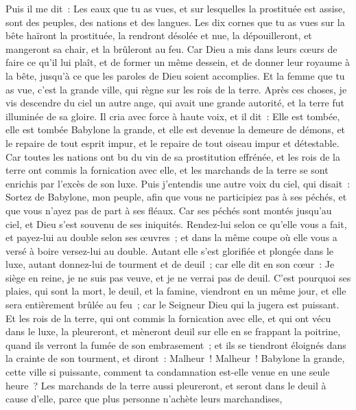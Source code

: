 \begin{multicols}{2}
Puis il me dit~: Les eaux que tu as vues, et sur lesquelles la prostituée est assise, sont des peuples, des nations et des langues.
Les dix cornes que tu as vues sur la bête haïront la prostituée, la rendront désolée et nue, la dépouilleront, et mangeront sa chair, et la brûleront au feu.
Car Dieu a mis dans leurs cœurs de faire ce qu'il lui plaît, et de former un même dessein, et de donner leur royaume à la bête, jusqu'à ce que les paroles de Dieu soient accomplies.
Et la femme que tu as vue, c'est la grande ville, qui règne sur les rois de la terre.
\VerseOne{}Après ces choses, je vis descendre du ciel un autre ange, qui avait une grande autorité, et la terre fut illuminée de sa gloire.
Il cria avec force à haute voix, et il dit~: Elle est tombée, elle est tombée Babylone la grande, et elle est devenue la demeure de démons, et le repaire de tout esprit impur, et le repaire de tout oiseau impur et détestable.
Car toutes les nations ont bu du vin de sa prostitution effrénée, et les rois de la terre ont commis la fornication avec elle, et les marchands de la terre se sont enrichis par l'excès de son luxe.
Puis j'entendis une autre voix du ciel, qui disait~: Sortez de Babylone, mon peuple, afin que vous ne participiez pas à ses péchés, et que vous n'ayez pas de part à ses fléaux.
Car ses péchés sont montés jusqu'au ciel, et Dieu s'est souvenu de ses iniquités.
Rendez-lui selon ce qu'elle vous a fait, et payez-lui au double selon ses œuvres~; et dans la même coupe où elle vous a versé à boire versez-lui au double.
Autant elle s'est glorifiée et plongée dans le luxe, autant donnez-lui de tourment et de deuil~; car elle dit en son cœur~: Je siège en reine, je ne suis pas veuve, et je ne verrai pas de deuil.
C'est pourquoi ses plaies, qui sont la mort, le deuil, et la famine, viendront en un même jour, et elle sera entièrement brûlée au feu~; car le Seigneur Dieu qui la jugera est puissant.
Et les rois de la terre, qui ont commis la fornication avec elle, et qui ont vécu dans le luxe, la pleureront, et mèneront deuil sur elle en se frappant la poitrine, quand ils verront la fumée de son embrasement~;
et ils se tiendront éloignés dans la crainte de son tourment, et diront~: Malheur~! Malheur~! Babylone la grande, cette ville si puissante, comment ta condamnation est-elle venue en une seule heure~?
Les marchands de la terre aussi pleureront, et seront dans le deuil à cause d'elle, parce que plus personne n'achète leurs marchandises,

\end{multicols}
